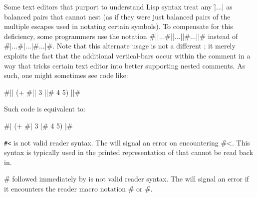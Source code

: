 
Some text editors that purport to understand Lisp syntax treat any \f{|...|}
as balanced pairs that cannot nest (as if they were just balanced pairs of 
the multiple escapes used in notating certain symbols).  To compensate for 
this deficiency, some programmers use the notation \f{\#||...\#||...||\#...||\#}
instead of \f{\#|...\#|...|\#...|\#}.   Note that this alternate usage is not
a different ; it merely exploits the fact that the additional
vertical-bars occur within the comment in a way that tricks certain text editor
into better supporting nested comments.  As such, one might sometimes see code
like:

\code
 #|| (+ #|| 3 ||# 4 5) ||# 
\endcode

Such code is equivalent to:

\code
 #| (+ #| 3 |# 4 5) |#
\endcode

\endsubsubsubsubsection%

\endsubsubsubsection%

\endsubsubsection%



{\tt  \#<} is not valid reader syntax.
The  will signal an error 
on encountering \f{\#<}.
This syntax is typically used in the printed representation 
of  that cannot be read back in.  

\endsubsubsection%




\f{\#} followed immediately by  is not valid reader syntax.
The  will signal an error  if it
encounters the reader macro notation \f{\#\NewlineChar} or \f{\#\SpaceChar}.

\endsubsubsection%


